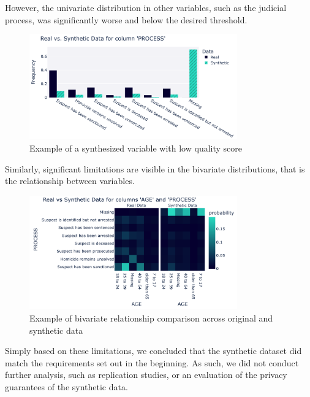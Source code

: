 However, the univariate distribution in other variables, such as the judicial process, was significantly worse and below the desired threshold.

\vspace{10pt}
\begin{figure}[h!]
    \centering
    \includegraphics[width=0.8\textwidth]{Images/SENSYN_badsyn1.png}
    \caption{Example of a synthesized variable with low quality score}
    \label{fig:proof_1}
\end{figure}
\vspace{10pt}

Similarly, significant limitations are visible in the bivariate distributions, that is the relationship between variables.

\vspace{10pt}
\begin{figure}[h!]
    \centering
    \includegraphics[width=0.8\textwidth]{Images/SENSYN_biva1.png}
    \caption{Example of bivariate relationship comparison across original and synthetic data}
    \label{fig:proof_1}
\end{figure}
\vspace{10pt}

Simply based on these limitations, we concluded that the synthetic dataset did match the requirements set out in the beginning. As such, we did not conduct further analysis, such as replication studies, or an evaluation of the privacy guarantees of the synthetic data.\\


